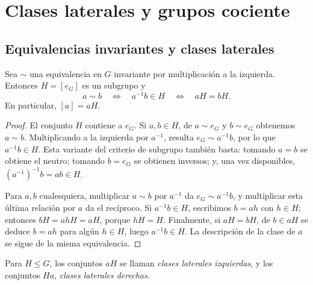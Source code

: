\section{Clases laterales y grupos cociente}
\subsection{Equivalencias invariantes y clases laterales}
\begin{prop}\label{prop:C5-clases}
Sea $\sim$ una equivalencia en $G$ invariante por multiplicación a la izquierda. Entonces $H=[e_G]$ es un subgrupo y
\[
a\sim b\quad\Longleftrightarrow\quad a^{-1}b\in H
\quad\Longleftrightarrow\quad aH=bH.
\]
En particular, $[a]=aH$.
\end{prop}
\begin{proof}
El conjunto $H$ contiene a $e_G$. Si $a,b\in H$, de $a\sim e_G$ y $b\sim e_G$ obtenemos $a\sim b$. Multiplicando a la izquierda por $a^{-1}$, resulta $e_G\sim a^{-1}b$, por lo que $a^{-1}b\in H$. Esta variante del criterio de subgrupo también basta: tomando $a=b$ se obtiene el neutro; tomando $b=e_G$ se obtienen inversos; y, una vez disponibles, $(a^{-1})^{-1}b=ab\in H$.

Para $a,b$ cualesquiera, multiplicar $a\sim b$ por $a^{-1}$ da $e_G\sim a^{-1}b$, y multiplicar esta última relación por $a$ da el recíproco. Si $a^{-1}b\in H$, escribimos $b=ah$ con $h\in H$; entonces $bH=ahH=aH$, porque $hH=H$. Finalmente, si $aH=bH$, de $b\in aH$ se deduce $b=ah$ para algún $h\in H$, luego $a^{-1}b\in H$. La descripción de la clase de $a$ se sigue de la misma equivalencia.
\end{proof}

\begin{defi}
Para $H\le G$, los conjuntos $aH$ se llaman \emph{clases laterales izquierdas}, y los conjuntos $Ha$, \emph{clases laterales derechas}.
\end{defi}

